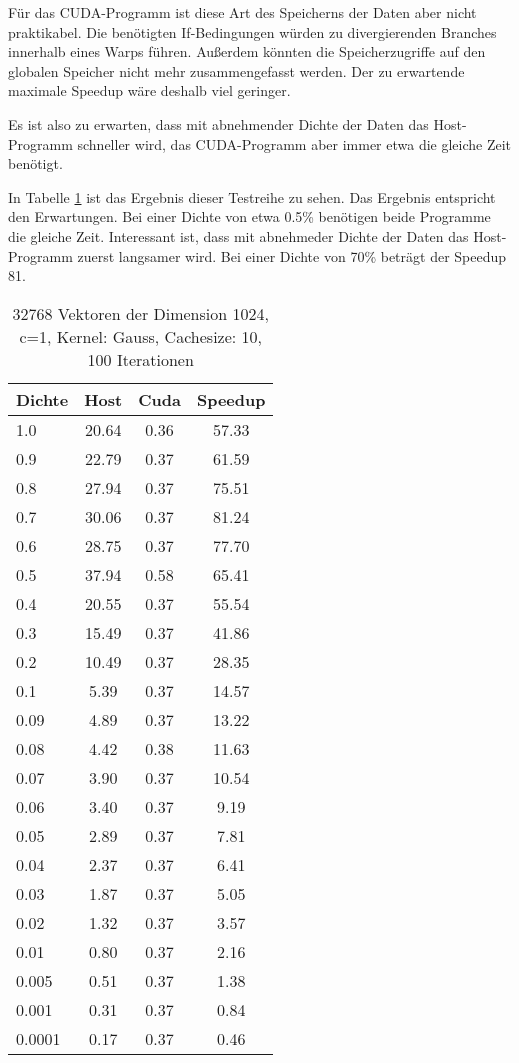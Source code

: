 \documentclass[ngerman]{scrartcl}
\begin{document}
Für das CUDA-Programm ist diese Art des Speicherns der Daten aber nicht praktikabel. Die benötigten If-Bedingungen würden zu divergierenden Branches innerhalb eines Warps führen. 
Außerdem könnten die Speicherzugriffe auf den globalen Speicher nicht mehr zusammengefasst werden. Der zu erwartende maximale Speedup wäre deshalb viel geringer.

Es ist also zu erwarten, dass mit abnehmender Dichte der Daten das Host-Programm schneller wird, das CUDA-Programm aber immer etwa die gleiche Zeit benötigt. 

In Tabelle \ref{tbl:density-gauss-10} ist das Ergebnis dieser Testreihe zu sehen. Das Ergebnis entspricht den Erwartungen. 
Bei einer Dichte von etwa 0.5\%  benötigen beide Programme die gleiche Zeit.
Interessant ist, dass mit abnehmeder Dichte der Daten das Host-Programm zuerst langsamer wird. Bei einer Dichte von 70\% beträgt der Speedup 81. 


\begin{table}
\begin{center}
\begin{tabular}{|l|c|c|c|}
\hline
Dichte & Host & Cuda & Speedup \\
\hline
1.0 & 20.64 & 0.36 & 57.33 \\
0.9 & 22.79 & 0.37 & 61.59 \\
0.8 & 27.94 & 0.37 & 75.51 \\
0.7 & 30.06 & 0.37 & 81.24 \\
0.6 & 28.75 & 0.37 & 77.70 \\
0.5 & 37.94 & 0.58 & 65.41 \\
0.4 & 20.55 & 0.37 & 55.54 \\
0.3 & 15.49 & 0.37 & 41.86 \\
0.2 & 10.49 & 0.37 & 28.35 \\
0.1 & 5.39 & 0.37 & 14.57 \\
0.09 & 4.89 & 0.37 & 13.22 \\
0.08 & 4.42 & 0.38 & 11.63 \\
0.07 & 3.90 & 0.37 & 10.54 \\
0.06 & 3.40 & 0.37 & 9.19 \\
0.05 & 2.89 & 0.37 & 7.81 \\
0.04 & 2.37 & 0.37 & 6.41 \\
0.03 & 1.87 & 0.37 & 5.05 \\
0.02 & 1.32 & 0.37 & 3.57 \\
0.01 & 0.80 & 0.37 & 2.16 \\
0.005 & 0.51 & 0.37 & 1.38 \\
0.001 & 0.31 & 0.37 & 0.84 \\
0.0001 & 0.17 & 0.37 & 0.46 \\
\hline
\end{tabular}
\end{center}
\caption{ 32768 Vektoren der Dimension 1024, c=1, Kernel: Gauss, Cachesize: 10, 100 Iterationen}
\label{tbl:density-gauss-10}
\end{table}
\end{document}
